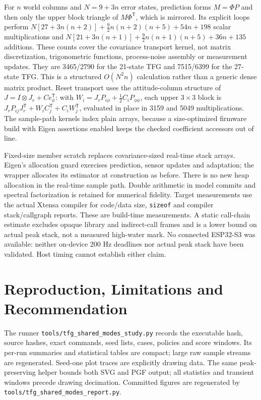\documentclass[conference]{IEEEtran}
\newcommand{\T}{^{\mathsf T}}\newcommand{\Hh}{^{\mathsf H}}
\begin{document}
For $n$ world columns and $N=9+3n$ error states, prediction forms
$M=\Phi P$ and then only the upper block triangle of $M\Phi\T$, which is
mirrored. Its explicit loops perform
$N[27+3n(n+2)]+\tfrac92 n(n+2)(n+5)+54n+198$ scalar multiplications and
$N[21+3n(n+1)]+\tfrac92 n(n+1)(n+5)+36n+135$ additions. These counts cover the
covariance transport kernel, not matrix discretization, trigonometric functions,
process-noise assembly or measurement updates. They are 3465/2790 for the
21-state TFG and 7515/6399 for the 27-state TFG. This is a structured
$O(N^2n)$ calculation rather than a generic dense matrix product. Reset
transport uses the attitude-column structure of $J=I\otimes J_r+C e_\phi\T$:
with $W_i=J_rP_{i\phi}+\tfrac12C_iP_{\phi\phi}$, each upper $3\times3$ block
is $J_rP_{ij}J_r\T+W_iC_j\T+C_iW_j\T$, evaluated in place in 3159 and 5049
multiplications. The sample-path kernels index plain arrays, because a
size-optimized firmware build with Eigen assertions enabled keeps the checked
coefficient accessors out of line.

\PerformanceResults
Fixed-size member scratch replaces covariance-sized real-time stack arrays.
Eigen's allocation guard exercises prediction, sensor updates and adaptation;
the wrapper allocates its estimator at construction as before. There is no
new heap allocation in the real-time sample path. Double arithmetic in model
commits and spectral factorization is retained for numerical fidelity.
Target measurements use the actual Xtensa compiler for code/data size,
\texttt{sizeof} and compiler stack/callgraph reports. These are build-time
measurements. A static call-chain estimate excludes opaque library and
indirect-call frames and is a lower bound on actual peak stack, not a measured
high-water mark. No connected ESP32-S3 was available: neither on-device
200 Hz deadlines nor actual peak stack have been validated. Host timing cannot
establish either claim. \FirmwareResults

\section{Reproduction, Limitations and Recommendation}
The runner \texttt{tools/tfg\_shared\_modes\_study.py} records the executable
hash, source hashes, exact commands, seed lists, cases, policies and score
windows. Its per-run summaries and statistical tables are compact; large raw
sample streams are regenerated. Seed-one plot traces are explicitly drawing
data. The same peak-preserving helper bounds both SVG and PGF output; all
statistics and transient windows precede drawing decimation. Committed figures
are regenerated by \texttt{tools/tfg\_shared\_modes\_report.py}.
\end{document}
